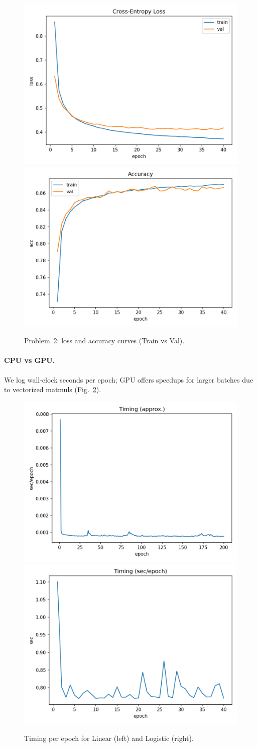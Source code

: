 \documentclass{article}
\begin{document}
\begin{figure}[t]
\centering
\includegraphics[width=.48\linewidth]{figs/fashionmnist_adam_b256_lr0.001_val0.1_seed808_loss.png}\hfill
\includegraphics[width=.48\linewidth]{figs/fashionmnist_adam_b256_lr0.001_val0.1_seed808_acc.png}
\caption{Problem~2: loss and accuracy curves (Train vs Val).}
\label{fig:log-curves}
\end{figure}

\paragraph{CPU vs GPU.} We log wall-clock seconds per epoch; GPU offers speedups for larger batches due to vectorized matmuls (Fig.~\ref{fig:log-time}).

\begin{figure}[t]
\centering
\includegraphics[width=.48\linewidth]{figs/linreg_l2_lr0.05_noise0.5_seed808_time.png}\hfill
\includegraphics[width=.48\linewidth]{figs/fashionmnist_adam_b256_lr0.001_val0.1_seed808_time.png}
\caption{Timing per epoch for Linear (left) and Logistic (right).}
\label{fig:lin-time}\label{fig:log-time}
\end{figure}
\end{document}
